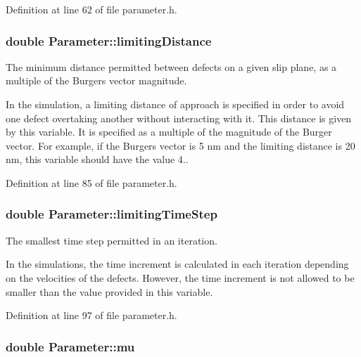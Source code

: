 \-Definition at line 62 of file parameter.\-h.

\hypertarget{classParameter_a455283e72194ffb9f457a0d0ae86c582}{
\subsubsection[{limiting\-Distance}]{\setlength{\rightskip}{0pt plus 5cm}double {\bf \-Parameter\-::limiting\-Distance}}}\label{dc/dab/classParameter_a455283e72194ffb9f457a0d0ae86c582}


\-The minimum distance permitted between defects on a given slip plane, as a multiple of the \-Burgers vector magnitude. 

\-In the simulation, a limiting distance of approach is specified in order to avoid one defect overtaking another without interacting with it. \-This distance is given by this variable. \-It is specified as a multiple of the magnitude of the \-Burger vector. \-For example, if the \-Burgers vector is 5 nm and the limiting distance is 20 nm, this variable should have the value 4.. 

\-Definition at line 85 of file parameter.\-h.

\hypertarget{classParameter_a898b2121be4317971d62f4c103674173}{
\subsubsection[{limiting\-Time\-Step}]{\setlength{\rightskip}{0pt plus 5cm}double {\bf \-Parameter\-::limiting\-Time\-Step}}}\label{dc/dab/classParameter_a898b2121be4317971d62f4c103674173}


\-The smallest time step permitted in an iteration. 

\-In the simulations, the time increment is calculated in each iteration depending on the velocities of the defects. \-However, the time increment is not allowed to be smaller than the value provided in this variable. 

\-Definition at line 97 of file parameter.\-h.

\hypertarget{classParameter_a18c602586565fbc1ac773ef3e1bf46a4}{
\subsubsection[{mu}]{\setlength{\rightskip}{0pt plus 5cm}double {\bf \-Parameter\-::mu}}}\label{dc/dab/classParameter_a18c602586565fbc1ac773ef3e1bf46a4}


